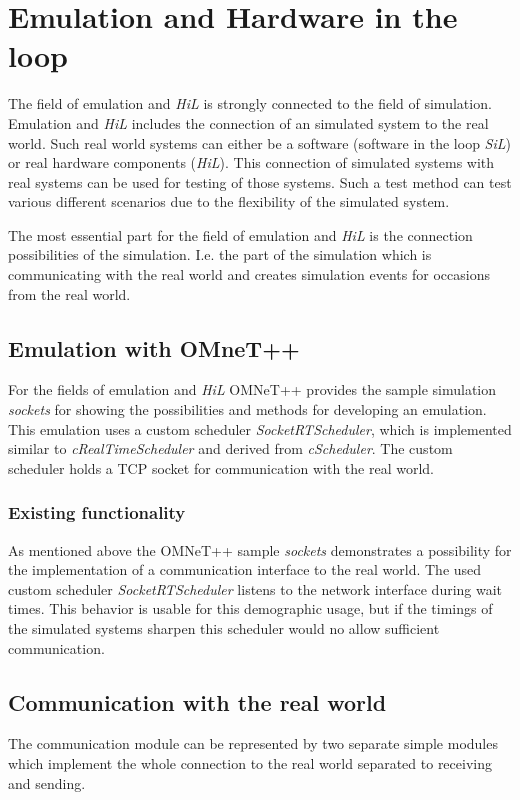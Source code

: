 \chapter{Emulation and Hardware in the loop}
\label{cha:emulation}

The field of emulation and \emph{HiL} is strongly connected to the field of simulation.
Emulation and \emph{HiL} includes the connection of an simulated system to the real world.
Such real world systems can either be a software (software in the loop \emph{SiL}) or real hardware components (\emph{HiL}).
This connection of simulated systems with real systems can be used for testing of those systems.
Such a test method can test various different scenarios due to the flexibility of the simulated system.

The most essential part for the field of emulation and \emph{HiL} is the connection possibilities of the simulation.
I.e. the part of the simulation which is communicating with the real world and creates simulation events for occasions from the real world.


\section{Emulation with OMneT++}
\label{sec:emulation_omnet}
For the fields of emulation and \emph{HiL} OMNeT++ provides the sample simulation \emph{sockets} for showing the possibilities and methods for developing an emulation.
This emulation uses a custom scheduler \emph{SocketRTScheduler}, which is implemented similar to \emph{cRealTimeScheduler} and derived from \emph{cScheduler}.
The custom scheduler holds a TCP socket for communication with the real world.

\subsection{Existing functionality}
\label{sec:emulation_omnet_existing}
As mentioned above the OMNeT++ sample \emph{sockets} demonstrates a possibility for the implementation of a communication interface to the real world.
The used custom scheduler \emph{SocketRTScheduler} listens to the network interface during wait times.
This behavior is usable for this demographic usage, but if the timings of the simulated systems sharpen this scheduler would no allow sufficient communication.


\section{Communication with the real world}
The communication module can be represented by two separate simple modules which implement the whole connection to the real world separated to receiving and sending.

